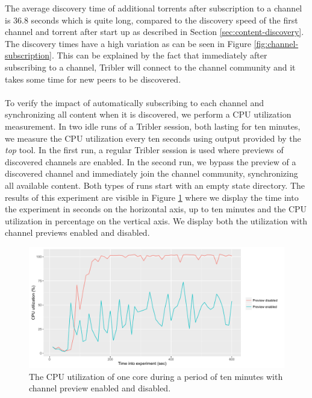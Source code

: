 \noindent The average discovery time of additional torrents after subscription to a channel is 36.8 seconds which is quite long, compared to the discovery speed of the first channel and torrent after start up as described in Section \ref{sec:content-discovery}. The discovery times have a high variation as can be seen in Figure \ref{fig:channel-subscription}. This can be explained by the fact that immediately after subscribing to a channel, Tribler will connect to the channel community and it takes some time for new peers to be discovered.\\\\
To verify the impact of automatically subscribing to each channel and synchronizing all content when it is discovered, we perform a CPU utilization measurement. In two idle runs of a Tribler session, both lasting for ten minutes, we measure the CPU utilization every ten seconds using output provided by the \emph{top} tool. In the first run, a regular Tribler session is used where previews of discovered channels are enabled. In the second run, we bypass the preview of a discovered channel and immediately join the channel community, synchronizing all available content. Both types of runs start with an empty state directory. The results of this experiment are visible in Figure \ref{fig:channel-subscription-cpu} where we display the time into the experiment in seconds on the horizontal axis, up to ten minutes and the CPU utilization in percentage on the vertical axis. We display both the utilization with channel previews enabled and disabled.

\begin{figure}[!h]
	\centering
	\includegraphics[width=1.0\columnwidth]{images/experiments/subscribe_cpu_experiment}
	\caption{The CPU utilization of one core during a period of ten minutes with channel preview enabled and disabled.}
	\label{fig:channel-subscription-cpu}
\end{figure}

